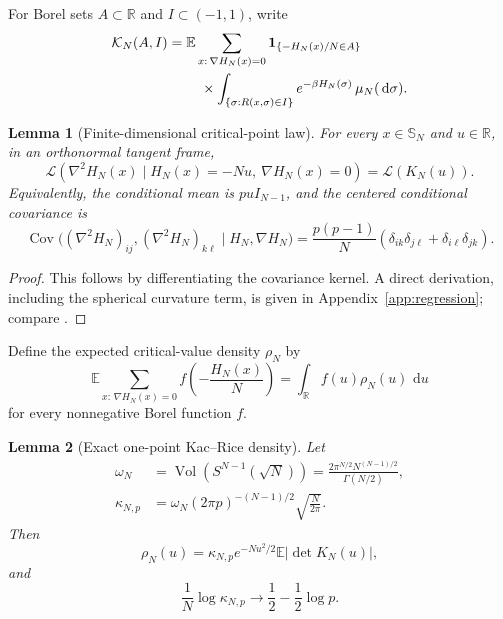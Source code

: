 \documentclass[11pt,reqno]{amsart}
\numberwithin{equation}{section}
\theoremstyle{plain}
\newtheorem{lemma}[lemma]{Lemma}
\theoremstyle{definition}
\theoremstyle{remark}
\newcommand{\SN}{\mathbb{S}_N}
\newcommand{\E}{\mathbb E}
\newcommand{\R}{\mathbb R}
\newcommand{\1}{\mathbf 1}
\newcommand{\dd}{\,\mathrm d}
\begin{document}
For Borel sets \(A\subset\R\) and \(I\subset(-1,1)\), write
\begin{align}
 \mathcal K_N(A,I)
 ={}&\E\sum_{x:\,\nabla H_N(x)=0}
 \1_{\{-H_N(x)/N\in A\}}\notag\\
 &\quad\times
 \int_{\{\sigma:R(x,\sigma)\in I\}}
 e^{-\beta H_N(\sigma)}\,\mu_N(\dd\sigma).
 \label{eq:calKdefinition}
\end{align}

\begin{lemma}[Finite-dimensional critical-point law]
\label{lem:finitecritical}
For every \(x\in\SN\) and \(u\in\R\), in an orthonormal tangent frame,
\begin{equation}\label{eq:conditionalHessian}
 \mathcal L\left(\nabla^2H_N(x)\mid
 H_N(x)=-Nu,\ \nabla H_N(x)=0\right)
 =\mathcal L(K_N(u)).
\end{equation}
Equivalently, the conditional mean is \(puI_{N-1}\), and the centered
conditional covariance is
\begin{equation}\label{eq:conditionalHessianCov}
 \operatorname{Cov}\bigl((\nabla^2H_N)_{ij},(\nabla^2H_N)_{k\ell}
 \mid H_N,\nabla H_N\bigr)
 =\frac{p(p-1)}N
 (\delta_{ik}\delta_{j\ell}+\delta_{i\ell}\delta_{jk}).
\end{equation}
\end{lemma}

\begin{proof}
This follows by differentiating the covariance kernel.  A direct
derivation, including the spherical curvature term, is given in
Appendix~\ref{app:regression}; compare
\cite[Lemma~3.2]{AuffingerBenArousCerny2013}.
\end{proof}

Define the expected critical-value density \(\rho_N\) by
\begin{equation}\label{eq:rhoDefinition}
 \E\sum_{x:\,\nabla H_N(x)=0}
 f\left(-\frac{H_N(x)}N\right)
 =\int_{\R}f(u)\rho_N(u)\,\dd u
\end{equation}
for every nonnegative Borel function \(f\).

\begin{lemma}[Exact one-point Kac--Rice density]\label{lem:exactrho}
Let
\begin{equation}\label{eq:kappa}
 \begin{aligned}
  \omega_N&=\operatorname{Vol}(S^{N-1}(\sqrt N))
  =\frac{2\pi^{N/2}N^{(N-1)/2}}{\Gamma(N/2)},\\
  \kappa_{N,p}&=\omega_N(2\pi p)^{-(N-1)/2}
  \sqrt{\frac N{2\pi}}.
 \end{aligned}
\end{equation}
Then
\begin{equation}\label{eq:rhoExact}
 \rho_N(u)=\kappa_{N,p}e^{-Nu^2/2}
 \E\lvert\det K_N(u)\rvert,
\end{equation}
and
\begin{equation}\label{eq:kappaLimit}
 \frac1N\log\kappa_{N,p}\longrightarrow
 \frac12-\frac12\log p.
\end{equation}
\end{lemma}
\end{document}
